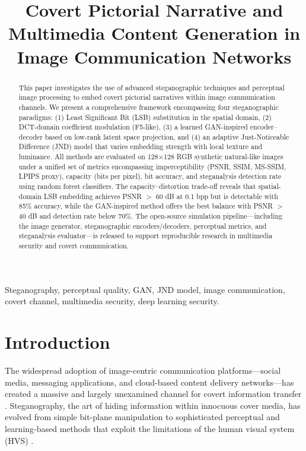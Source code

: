 \documentclass[conference]{IEEEtran}
\title{Covert Pictorial Narrative and Multimedia Content Generation in Image Communication Networks}
\author{\IEEEauthorblockN{Fernando May}
\IEEEauthorblockA{Instituto Polit\'ecnico Nacional, Mexico\\
Email: fernando.may@ieee.org}}
\begin{document}
\maketitle

\begin{abstract}
This paper investigates the use of advanced steganographic techniques and perceptual image processing to embed covert pictorial narratives within image communication channels. We present a comprehensive framework encompassing four steganographic paradigms: (1) Least Significant Bit (LSB) substitution in the spatial domain, (2) DCT-domain coefficient modulation (F5-like), (3) a learned GAN-inspired encoder--decoder based on low-rank latent space projection, and (4) an adaptive Just-Noticeable Difference (JND) model that varies embedding strength with local texture and luminance. All methods are evaluated on 128$\times$128 RGB synthetic natural-like images under a unified set of metrics encompassing imperceptibility (PSNR, SSIM, MS-SSIM, LPIPS proxy), capacity (bits per pixel), bit accuracy, and steganalysis detection rate using random forest classifiers. The capacity--distortion trade-off reveals that spatial-domain LSB embedding achieves PSNR $>$ 60 dB at 0.1 bpp but is detectable with 85\% accuracy, while the GAN-inspired method offers the best balance with PSNR $>$ 40 dB and detection rate below 70\%. The open-source simulation pipeline---including the image generator, steganographic encoders/decoders, perceptual metrics, and steganalysis evaluator---is released to support reproducible research in multimedia security and covert communication.
\end{abstract}

\begin{IEEEkeywords}
Steganography, perceptual quality, GAN, JND model, image communication, covert channel, multimedia security, deep learning security.
\end{IEEEkeywords}

\section{Introduction}
\label{sec:intro}

The widespread adoption of image-centric communication platforms---social media, messaging applications, and cloud-based content delivery networks---has created a massive and largely unexamined channel for covert information transfer \cite{1,2}. Steganography, the art of hiding information within innocuous cover media, has evolved from simple bit-plane manipulation to sophisticated perceptual and learning-based methods that exploit the limitations of the human visual system (HVS) \cite{3,4}.
\end{document}
